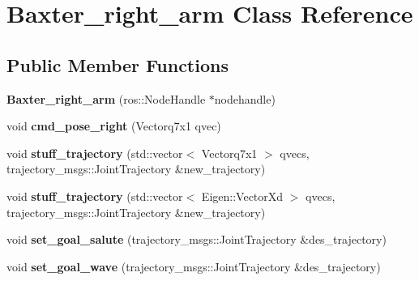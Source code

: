 \hypertarget{class_baxter__right__arm}{\section{Baxter\-\_\-right\-\_\-arm Class Reference}
\label{class_baxter__right__arm}
}
\subsection*{Public Member Functions}
\begin{DoxyCompactItemize}
\item 
\hypertarget{class_baxter__right__arm_a809511888c924fccb9edf23fb7cfa374}{{\bfseries Baxter\-\_\-right\-\_\-arm} (ros\-::\-Node\-Handle $\ast$nodehandle)}\label{class_baxter__right__arm_a809511888c924fccb9edf23fb7cfa374}

\item 
\hypertarget{class_baxter__right__arm_a980d0401897be70e62cb5996ed8ec8a7}{void {\bfseries cmd\-\_\-pose\-\_\-right} (Vectorq7x1 qvec)}\label{class_baxter__right__arm_a980d0401897be70e62cb5996ed8ec8a7}

\item 
\hypertarget{class_baxter__right__arm_abc89c7b1adc1c0bc66e9509a60d5bf54}{void {\bfseries stuff\-\_\-trajectory} (std\-::vector$<$ Vectorq7x1 $>$ qvecs, trajectory\-\_\-msgs\-::\-Joint\-Trajectory \&new\-\_\-trajectory)}\label{class_baxter__right__arm_abc89c7b1adc1c0bc66e9509a60d5bf54}

\item 
\hypertarget{class_baxter__right__arm_a816a3a01cdfd11d2543f488b872714a2}{void {\bfseries stuff\-\_\-trajectory} (std\-::vector$<$ Eigen\-::\-Vector\-Xd $>$ qvecs, trajectory\-\_\-msgs\-::\-Joint\-Trajectory \&new\-\_\-trajectory)}\label{class_baxter__right__arm_a816a3a01cdfd11d2543f488b872714a2}

\item 
\hypertarget{class_baxter__right__arm_a5f9d9efab251a2cbf90ae7da8afd59c6}{void {\bfseries set\-\_\-goal\-\_\-salute} (trajectory\-\_\-msgs\-::\-Joint\-Trajectory \&des\-\_\-trajectory)}\label{class_baxter__right__arm_a5f9d9efab251a2cbf90ae7da8afd59c6}

\item 
\hypertarget{class_baxter__right__arm_a35ca1d65ed688a251177ebd95a1d1169}{void {\bfseries set\-\_\-goal\-\_\-wave} (trajectory\-\_\-msgs\-::\-Joint\-Trajectory \&des\-\_\-trajectory)}\label{class_baxter__right__arm_a35ca1d65ed688a251177ebd95a1d1169}


\end{DoxyCompactItemize}

